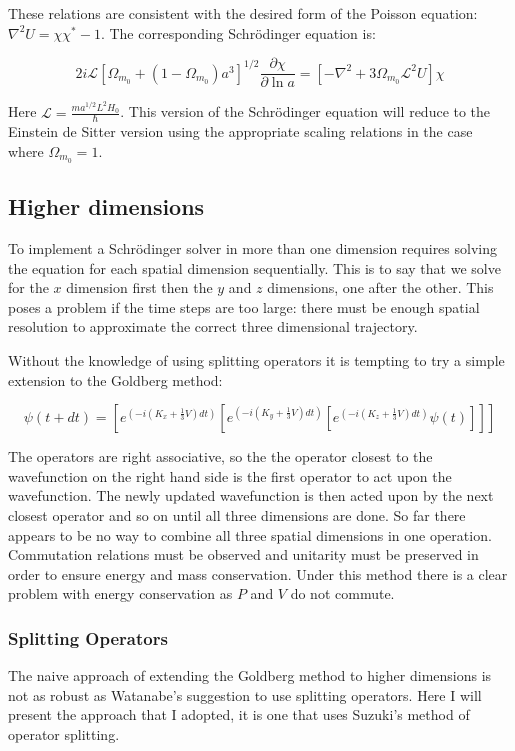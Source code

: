 \noindent These relations are consistent with the desired form of the Poisson equation: $\nabla^2 U = \chi \chi^* - 1$. The corresponding Schr\"odinger equation is:

\begin{equation}
2 i \mathcal{L}\left[\Omega_{m_0} +(1-\Omega_{m_0}) a^3 \right]^{1/2} \frac{\partial\chi}{\partial \ln a} = \left[-\nabla^2 + 3\Omega_{m_0}\mathcal{L}^2 U\right] \chi 
\end{equation}

\noindent Here $\mathcal{L} = \frac{m a^{1/2}L^2 H_0}{\hbar}$. This version of the Schr\"odinger equation will reduce to the Einstein de Sitter version using the appropriate scaling relations in the case where $\Omega_{m_0} = 1$.

\subsection{Higher dimensions}
To implement a Schr\"odinger solver in more than one dimension requires solving the equation for each spatial dimension sequentially.  This is to say that we solve for the $x$ dimension first then the $y$ and $z$ dimensions, one after the other. This poses a problem if the time steps are too large: there must be enough spatial resolution to approximate the correct three dimensional trajectory.

Without the knowledge of using splitting operators it is tempting to try a simple extension to the Goldberg method:

\begin{equation}
\psi(t+dt) = [e^{(-i(K_x + \frac{1}{3}V)dt)}  [e^{(-i(K_y + \frac{1}{3}V)dt)}  [e^{(-i(K_z + \frac{1}{3}V)dt)}\psi(t)]]]
\end{equation}

\noindent The operators are right associative, so the the operator closest to the wavefunction on the right hand side is the first operator to act upon the wavefunction. The newly updated wavefunction is then acted upon by the next closest operator and so on until all three dimensions are done. So far there appears to be no way to combine all three spatial dimensions in one operation. Commutation relations must be observed and unitarity must be preserved in order to ensure energy and mass conservation. Under this method there is a clear problem with energy conservation as $P$ and $V$ do not commute.

\subsubsection{Splitting Operators}
\label{split}
The naive approach of extending the Goldberg method to higher dimensions is not as robust as Watanabe's suggestion to use splitting operators. Here I will present the approach that I adopted, it is one that uses Suzuki's method of operator splitting.

